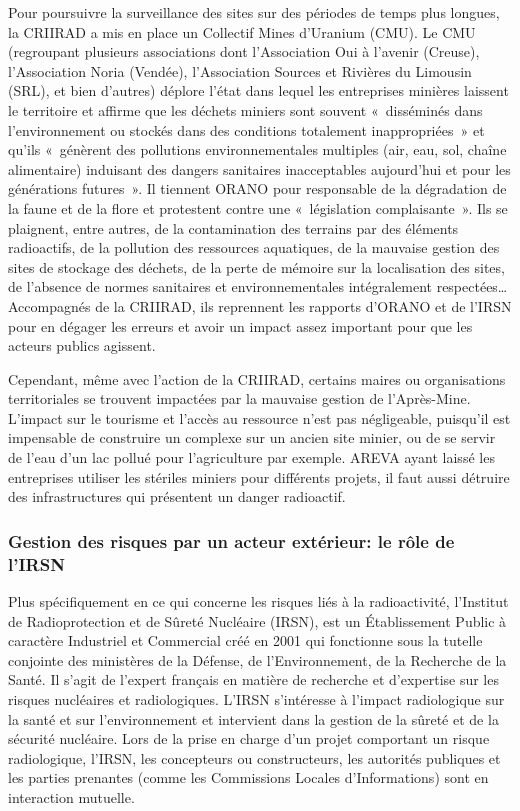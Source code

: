 \documentclass{article}
\begin{document}
Pour poursuivre la surveillance des sites sur des périodes de temps plus longues, la CRIIRAD a mis en place un Collectif Mines d’Uranium (CMU). Le CMU (regroupant plusieurs associations dont l’Association Oui à l'avenir (Creuse), l’Association Noria (Vendée), l’Association Sources et Rivières du Limousin (SRL), et bien d’autres) déplore  l’état dans lequel les entreprises minières laissent le territoire et  affirme que les déchets miniers sont souvent « disséminés dans l’environnement ou stockés dans des conditions totalement inappropriées » et qu’ils « génèrent des pollutions environnementales multiples (air, eau, sol, chaîne alimentaire) induisant des dangers sanitaires inacceptables aujourd’hui et pour les générations futures ». Il tiennent ORANO pour responsable de la dégradation de la faune et de la flore et protestent contre une « législation complaisante ». Ils se plaignent, entre autres, de la contamination des terrains par des éléments radioactifs, de la pollution des ressources aquatiques, de la mauvaise gestion des sites de stockage des déchets, de la perte de mémoire sur la localisation des sites, de l’absence de normes sanitaires et environnementales intégralement respectées… Accompagnés de la CRIIRAD, ils reprennent les rapports d’ORANO et de l’IRSN pour en dégager les erreurs et avoir un impact assez important pour que les acteurs publics agissent.

Cependant, même avec l’action de la CRIIRAD, certains maires ou organisations territoriales se trouvent impactées par la mauvaise gestion de l’Après-Mine. L’impact sur le tourisme et l’accès au ressource n’est pas négligeable, puisqu’il est impensable de construire un complexe sur un ancien site minier, ou de se servir de l’eau d’un lac pollué pour l’agriculture par exemple. AREVA ayant laissé les entreprises utiliser les stériles miniers pour différents projets, il faut aussi détruire des infrastructures qui présentent un danger radioactif.


\subsubsection{Gestion des risques par un acteur extérieur: le rôle de l’IRSN}
Plus spécifiquement en ce qui concerne les risques liés à la radioactivité, l'Institut de Radioprotection et de Sûreté Nucléaire (IRSN), est un Établissement Public à caractère Industriel et Commercial créé en 2001 qui fonctionne sous la tutelle conjointe des ministères de la Défense, de l’Environnement, de la Recherche de la Santé. Il s’agit de l’expert français en matière de recherche et d’expertise sur les risques nucléaires et radiologiques. L’IRSN s’intéresse à l’impact radiologique sur la santé et sur l'environnement et intervient dans la gestion de la sûreté et de la sécurité nucléaire.  Lors de la prise en charge d’un projet comportant un risque radiologique, l’IRSN, les concepteurs ou constructeurs, les autorités publiques et les parties prenantes (comme les Commissions Locales d’Informations) sont en interaction mutuelle.
\end{document}
